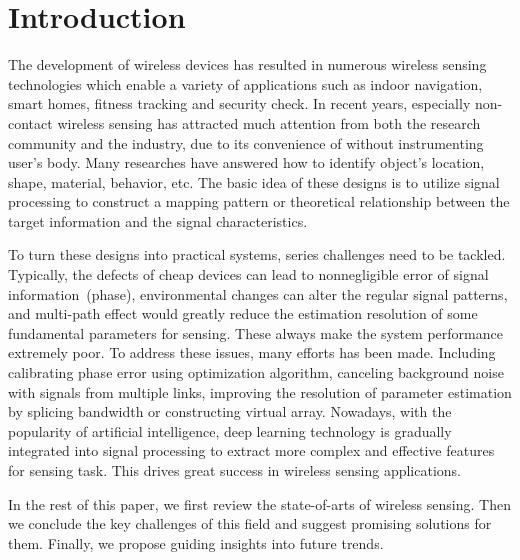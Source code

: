 \section{Introduction}
The development of wireless devices has resulted in numerous wireless sensing technologies which enable a variety of applications such as indoor navigation, smart homes, fitness tracking and security check. In recent years, especially non-contact wireless sensing has attracted much attention from both the research community and the industry, due to its convenience of without instrumenting user's body. Many researches have answered how to identify object's location, shape, material, behavior, etc. The basic idea of these designs is to utilize signal processing to construct a mapping pattern or theoretical relationship between the target information and the signal characteristics.

To turn these designs into practical systems, series challenges need to be tackled. Typically, the defects of cheap devices can lead to nonnegligible error of signal information~(phase), environmental changes can alter the regular signal patterns, and multi-path effect would greatly reduce the estimation resolution of some fundamental parameters for sensing. These always make the system performance extremely poor. To address these issues, many efforts has been made. Including calibrating phase error using optimization algorithm, canceling background noise with signals from multiple links, improving the resolution of parameter estimation by splicing bandwidth or constructing virtual array. Nowadays, with the popularity of artificial intelligence, deep learning technology is gradually integrated into signal processing to extract more complex and effective features for sensing task. This drives great success in wireless sensing applications.

In the rest of this paper, we first review the state-of-arts of wireless sensing. Then we conclude the key challenges of this field and suggest promising solutions for them. Finally, we propose guiding insights into future trends.
